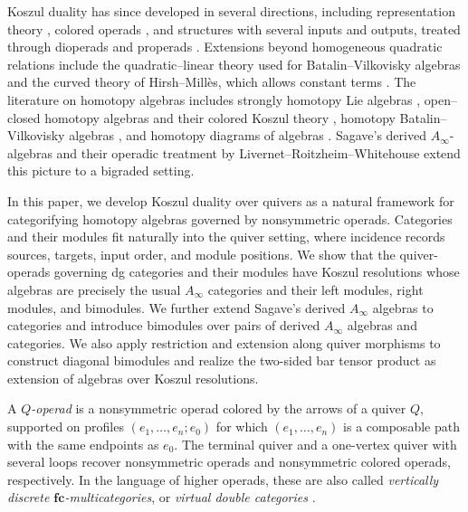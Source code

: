 \documentclass[11pt,letterpaper]{article}
\numberwithin{equation}{section}
\theoremstyle{plain}
\theoremstyle{definition}
\theoremstyle{remark}
\begin{document}
Koszul duality has since developed in several directions, including representation theory \cite{beilinson1996koszul}, colored operads \cite{vanderlaan2003coloured}, and structures with several inputs and outputs, treated through dioperads \cite{gan2003koszul} and properads \cite{Vallette_Koszul_props}. Extensions beyond homogeneous quadratic relations include the quadratic--linear theory used for Batalin--Vilkovisky algebras \cite{GalvezCarrillo_Tonks_Vallette_BV} and the curved theory of Hirsh--Mill\`es, which allows constant terms \cite{hirsh2012curved,hirsh2024correction}.
The literature on homotopy algebras includes strongly homotopy Lie algebras \cite{LadaMarkl1995}, open--closed homotopy algebras and their colored Koszul theory \cite{kajiura2006homotopy,Hoefel_Livernet_OCHA_SHLP}, homotopy Batalin--Vilkovisky algebras \cite{GalvezCarrillo_Tonks_Vallette_BV}, and homotopy diagrams of algebras \cite{Markl_Homotopy_Diagrams}. Sagave's derived $A_\infty$-algebras \cite{sagave2007dg} and their operadic treatment by Livernet--Roitzheim--Whitehouse \cite{Livernet_Roitzheim_Whitehouse_derived_Ainfinity} extend this picture to a bigraded setting.


In this paper, we develop Koszul duality over quivers as a natural framework for categorifying homotopy algebras governed by nonsymmetric operads. Categories and their modules fit naturally into the quiver setting, where incidence records sources, targets, input order, and module positions. We show that the quiver-operads governing dg categories and their modules have Koszul resolutions whose algebras are precisely the usual $A_\infty$ categories and their left modules, right modules, and bimodules. We further extend Sagave's derived $A_\infty$ algebras to categories and introduce bimodules over pairs of derived $A_\infty$ algebras and categories. We also apply restriction and extension along quiver morphisms to construct diagonal bimodules and realize the two-sided bar tensor product as extension of algebras over Koszul resolutions.

A \textit{$Q$-operad} is a nonsymmetric operad colored by the arrows of a quiver $Q$, supported on profiles $(e_1,\ldots,e_n;e_0)$ for which $(e_1,\ldots,e_n)$ is a composable path with the same endpoints as $e_0$. The terminal quiver and a one-vertex quiver with several loops recover nonsymmetric operads and nonsymmetric colored operads, respectively. In the language of higher operads, these are also called \textit{vertically discrete $\mathbf{fc}$-multicategories}, or \textit{virtual double categories} \cite{leinster1999fc,leinster2004higher,cruttwell2009unified}.
\end{document}

